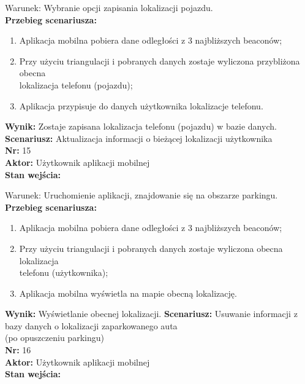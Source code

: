 \documentclass[12pt,a4paper]{article}
\begin{document}
Warunek: Wybranie opcji zapisania lokalizacji pojazdu.
\\{\bf Przebieg scenariusza:}
\begin{enumerate}
\item Aplikacja mobilna pobiera dane odległości z 3 najbliższych beaconów;
\item Przy użyciu triangulacji i pobranych danych zostaje wyliczona przybliżona obecna\\lokalizacja telefonu (pojazdu);
\item Aplikacja przypisuje do danych użytkownika lokalizacje telefonu.
\end{enumerate}
{\bf Wynik:} Zostaje zapisana lokalizacja telefonu (pojazdu) w bazie danych.
\newline\newline
{\large \bf Scenariusz:} Aktualizacja informacji o bieżącej lokalizacji użytkownika
\\{\bf Nr:} 15
\\{\bf Aktor:} Użytkownik aplikacji mobilnej
\\{\bf Stan wejścia:}

Warunek: Uruchomienie aplikacji, znajdowanie się na obszarze parkingu.
\\{\bf Przebieg scenariusza:}
\begin{enumerate}
\item Aplikacja mobilna pobiera dane odległości z 3 najbliższych beaconów;
\item Przy użyciu triangulacji i pobranych danych zostaje wyliczona obecna lokalizacja\\telefonu (użytkownika);
\item Aplikacja mobilna wyświetla na mapie obecną lokalizację.
\end{enumerate}
{\bf Wynik:} Wyświetlanie obecnej lokalizacji.
\newline\newline
{\large \bf Scenariusz:} Usuwanie informacji z bazy danych o lokalizacji zaparkowanego auta\\(po opuszczeniu parkingu)
\\{\bf Nr:} 16
\\{\bf Aktor:} Użytkownik aplikacji mobilnej
\\{\bf Stan wejścia:}
\end{document}
